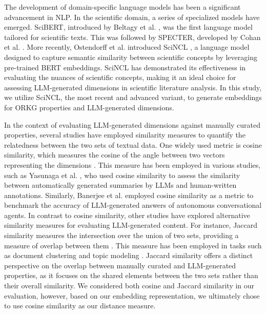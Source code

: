 The development of domain-specific language models has been a significant advancement in NLP. In the scientific domain, a series of specialized models have emerged. SciBERT, introduced by Beltagy et al. \cite{beltagy2019scibert}, was the first language model tailored for scientific texts. This was followed by SPECTER, developed by Cohan et al. \cite{cohan2020specter}. More recently, Ostendorff et al. introduced SciNCL \cite{ostendorff2022neighborhood}, a language model designed to capture semantic similarity between scientific concepts by leveraging pre-trained BERT embeddings. SciNCL has demonstrated its effectiveness in evaluating the nuances of scientific concepts, making it an ideal choice for assessing LLM-generated dimensions in scientific literature analysis. In this study, we utilize SciNCL, the most recent and advanced variant, to generate embeddings for ORKG properties and LLM-generated dimensions.

In the context of evaluating LLM-generated dimensions against manually curated properties, several studies have employed similarity measures to quantify the relatedness between the two sets of textual data. One widely used metric is cosine similarity, which measures the cosine of the angle between two vectors representing the dimensions \cite{singhal2001modern}. This measure has been employed in various studies, such as Yasunaga et al. \cite{yasunaga2019scisummnet}, who used cosine similarity to assess the similarity between automatically generated summaries by LLMs and human-written annotations. Similarly, Banerjee et al. \cite{banerjee2023benchmarking} employed cosine similarity as a metric to benchmark the accuracy of LLM-generated answers of autonomous conversational agents. In contrast to cosine similarity, other studies have explored alternative similarity measures for evaluating LLM-generated content. For instance, Jaccard similarity measures the intersection over the union of two sets, providing a measure of overlap between them \cite{verma2020comparative}. This measure has been employed in tasks such as document clustering and topic modeling \cite{ferdous2009efficient,o2015analysis}. Jaccard similarity offers a distinct perspective on the overlap between manually curated and LLM-generated properties, as it focuses on the shared elements between the two sets rather than their overall similarity. We considered both cosine and Jaccard similarity in our evaluation, however, based on our embedding representation, we ultimately chose to use cosine similarity as our distance measure.

